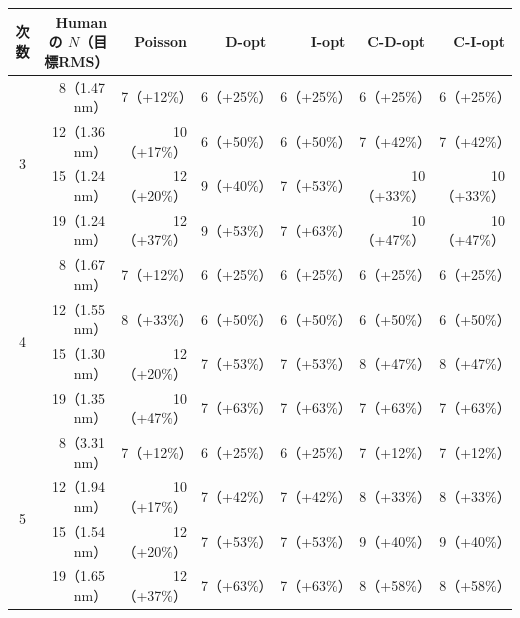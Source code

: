 
\begin{tabular}{crrrrrr}
\toprule
次数 & Human の $N$（目標RMS） & Poisson & D-opt & I-opt & C-D-opt & C-I-opt \\
\midrule
\multirow{4}{*}{3} & 8（1.47\,nm） & 7（+12\%） & 6（+25\%） & 6（+25\%） & 6（+25\%） & 6（+25\%） \\
 & 12（1.36\,nm） & 10（+17\%） & 6（+50\%） & 6（+50\%） & 7（+42\%） & 7（+42\%） \\
 & 15（1.24\,nm） & 12（+20\%） & 9（+40\%） & 7（+53\%） & 10（+33\%） & 10（+33\%） \\
 & 19（1.24\,nm） & 12（+37\%） & 9（+53\%） & 7（+63\%） & 10（+47\%） & 10（+47\%） \\
\midrule
\multirow{4}{*}{4} & 8（1.67\,nm） & 7（+12\%） & 6（+25\%） & 6（+25\%） & 6（+25\%） & 6（+25\%） \\
 & 12（1.55\,nm） & 8（+33\%） & 6（+50\%） & 6（+50\%） & 6（+50\%） & 6（+50\%） \\
 & 15（1.30\,nm） & 12（+20\%） & 7（+53\%） & 7（+53\%） & 8（+47\%） & 8（+47\%） \\
 & 19（1.35\,nm） & 10（+47\%） & 7（+63\%） & 7（+63\%） & 7（+63\%） & 7（+63\%） \\
\midrule
\multirow{4}{*}{5} & 8（3.31\,nm） & 7（+12\%） & 6（+25\%） & 6（+25\%） & 7（+12\%） & 7（+12\%） \\
 & 12（1.94\,nm） & 10（+17\%） & 7（+42\%） & 7（+42\%） & 8（+33\%） & 8（+33\%） \\
 & 15（1.54\,nm） & 12（+20\%） & 7（+53\%） & 7（+53\%） & 9（+40\%） & 9（+40\%） \\
 & 19（1.65\,nm） & 12（+37\%） & 7（+63\%） & 7（+63\%） & 8（+58\%） & 8（+58\%） \\
\bottomrule
\end{tabular}

